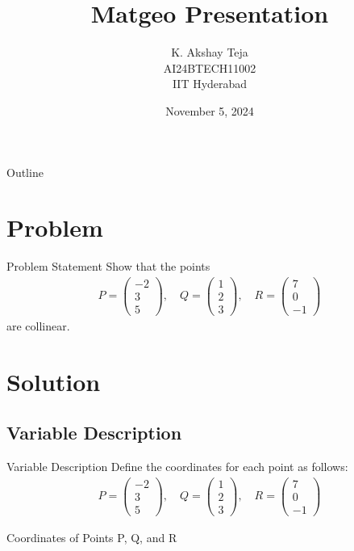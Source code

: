 \documentclass{beamer}
\title{Matgeo Presentation}
\author{K. Akshay Teja \\ AI24BTECH11002\\IIT Hyderabad}
\date{November 5, 2024}
\theoremstyle{remark}
\numberwithin{equation}{section}
\begin{document}
\begin{frame}
    \titlepage
\end{frame}


\begin{frame}{Outline}
    \tableofcontents
\end{frame}


\section{Problem}
\begin{frame}{Problem Statement}
    Show that the points 
    \begin{align}
    P = \begin{pmatrix} -2 \\ 3 \\ 5 \end{pmatrix}, \quad Q = \begin{pmatrix} 1 \\ 2 \\ 3 \end{pmatrix}, \quad R = \begin{pmatrix} 7 \\ 0 \\ -1 \end{pmatrix}
    \end{align}
    are collinear.
\end{frame}


\section{Solution}


\subsection{Variable Description}
\begin{frame}{Variable Description}
    Define the coordinates for each point as follows:
    \begin{align}
    P = \begin{pmatrix} -2 \\ 3 \\ 5 \end{pmatrix}, \quad Q = \begin{pmatrix} 1 \\ 2 \\ 3 \end{pmatrix}, \quad R = \begin{pmatrix} 7 \\ 0 \\ -1 \end{pmatrix}
    \end{align}
    \begin{table}[h!]
        \centering
	
        \caption{Coordinates of Points P, Q, and R}
    \end{table}
\end{frame}
\end{document}
